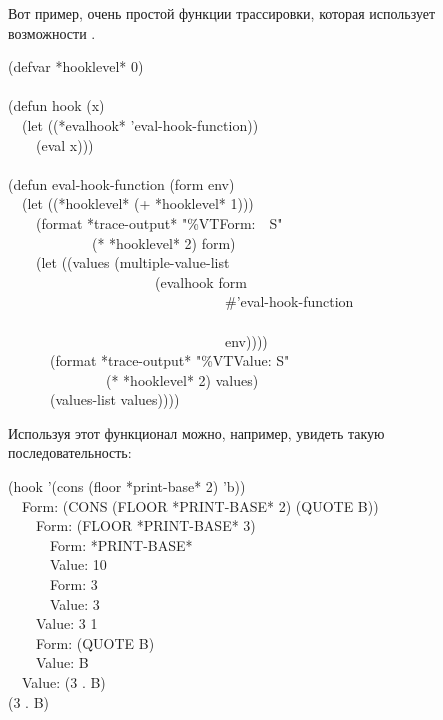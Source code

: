 \begin{defun}[Function]
Вот пример, очень простой функции трассировки, которая использует возможности
.
\begin{lisp}
(defvar *hooklevel* 0) \\
 \\
(defun hook (x) \\
~~(let ((*evalhook* 'eval-hook-function)) \\
~~~~(eval x))) \\
 \\
(defun eval-hook-function (form  env) \\
~~(let ((*hooklevel* (+ *hooklevel* 1))) \\
~~~~(format *trace-output* "{\Xtilde}\%{\Xtilde}V{\Xatsign}TForm:~~{\Xtilde}S" \\
~~~~~~~~~~~~(* *hooklevel* 2) form) \\
~~~~(let ((values (multiple-value-list \\
~~~~~~~~~~~~~~~~~~~~~(evalhook form \\
~~~~~~~~~~~~~~~~~~~~~~~~~~~~~~~\#'eval-hook-function \\
~~~~~~~~~~~~~~~~~~~~~~~~~~~~~~~{\nil} \\
~~~~~~~~~~~~~~~~~~~~~~~~~~~~~~~env)))) \\
~~~~~~(format *trace-output* "{\Xtilde}\%{\Xtilde}V{\Xatsign}TValue:{\Xtilde}{\Xlbrace} {\Xtilde}S{\Xtilde}{\Xrbrace}" \\
~~~~~~~~~~~~~~(* *hooklevel* 2) values) \\
~~~~~~(values-list values))))
\end{lisp}
Используя этот функционал можно, например, увидеть такую последовательность:
\begin{lisp}
(hook '(cons (floor *print-base* 2) 'b)) \\
~~Form:  (CONS (FLOOR *PRINT-BASE* 2) (QUOTE B)) \\
~~~~Form:  (FLOOR *PRINT-BASE* 3) \\
~~~~~~Form:  *PRINT-BASE* \\
~~~~~~Value: 10 \\
~~~~~~Form:  3 \\
~~~~~~Value: 3 \\
~~~~Value: 3 1 \\
~~~~Form:  (QUOTE B) \\
~~~~Value: B \\
~~Value: (3 . B) \\
(3 . B)
\end{lisp}
\end{defun}

